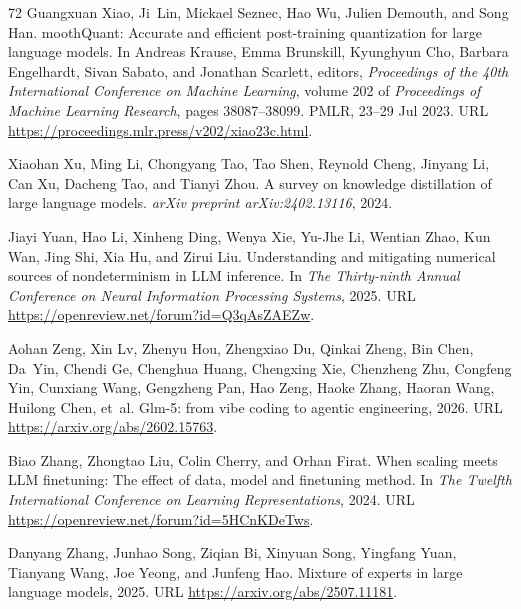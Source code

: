 \begin{thebibliography}{72}
Guangxuan Xiao, Ji~Lin, Mickael Seznec, Hao Wu, Julien Demouth, and Song Han.
mooth{Q}uant: Accurate and efficient post-training quantization for large language models.
\newblock In Andreas Krause, Emma Brunskill, Kyunghyun Cho, Barbara Engelhardt, Sivan Sabato, and Jonathan Scarlett, editors, \emph{Proceedings of the 40th International Conference on Machine Learning}, volume 202 of \emph{Proceedings of Machine Learning Research}, pages 38087--38099. PMLR, 23--29 Jul 2023.
\newblock URL \url{https://proceedings.mlr.press/v202/xiao23c.html}.

Xiaohan Xu, Ming Li, Chongyang Tao, Tao Shen, Reynold Cheng, Jinyang Li, Can Xu, Dacheng Tao, and Tianyi Zhou.
\newblock A survey on knowledge distillation of large language models.
\newblock \emph{arXiv preprint arXiv:2402.13116}, 2024.

Jiayi Yuan, Hao Li, Xinheng Ding, Wenya Xie, Yu-Jhe Li, Wentian Zhao, Kun Wan, Jing Shi, Xia Hu, and Zirui Liu.
\newblock Understanding and mitigating numerical sources of nondeterminism in {LLM} inference.
\newblock In \emph{The Thirty-ninth Annual Conference on Neural Information Processing Systems}, 2025.
\newblock URL \url{https://openreview.net/forum?id=Q3qAsZAEZw}.

Aohan Zeng, Xin Lv, Zhenyu Hou, Zhengxiao Du, Qinkai Zheng, Bin Chen, Da~Yin, Chendi Ge, Chenghua Huang, Chengxing Xie, Chenzheng Zhu, Congfeng Yin, Cunxiang Wang, Gengzheng Pan, Hao Zeng, Haoke Zhang, Haoran Wang, Huilong Chen, et~al.
\newblock Glm-5: from vibe coding to agentic engineering, 2026.
\newblock URL \url{https://arxiv.org/abs/2602.15763}.

Biao Zhang, Zhongtao Liu, Colin Cherry, and Orhan Firat.
\newblock When scaling meets {LLM} finetuning: The effect of data, model and finetuning method.
\newblock In \emph{The Twelfth International Conference on Learning Representations}, 2024.
\newblock URL \url{https://openreview.net/forum?id=5HCnKDeTws}.

Danyang Zhang, Junhao Song, Ziqian Bi, Xinyuan Song, Yingfang Yuan, Tianyang Wang, Joe Yeong, and Junfeng Hao.
\newblock Mixture of experts in large language models, 2025.
\newblock URL \url{https://arxiv.org/abs/2507.11181}.


\end{thebibliography}
